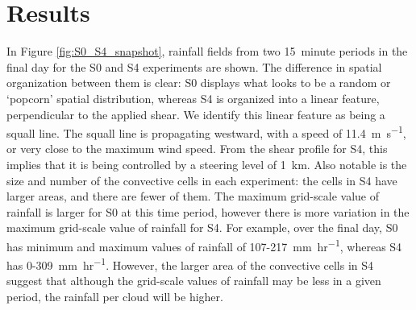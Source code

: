 \documentclass[11pt,a4paper]{article}
\begin{document}
\newpage
\section{Results}

%

%
In Figure \ref{fig:S0_S4_snapshot}, rainfall fields from two \SI{15}{minute} periods in the final day for the S0 and S4 experiments are shown. The difference in spatial organization between them is clear: S0 displays what looks to be a random or `popcorn' spatial distribution, whereas S4 is organized into a linear feature, perpendicular to the applied shear. We identify this linear feature as being a squall line. The squall line is propagating westward, with a speed of \SI{11.4}{m.s^{-1}}, or very close to the maximum wind speed. From the shear profile for S4, this implies that it is being controlled by a steering level of \SI{1}{km}. Also notable is the size and number of the convective cells in each experiment: the cells in S4 have larger areas, and there are fewer of them. The maximum grid-scale value of rainfall is larger for S0 at this time period, however there is more variation in the maximum grid-scale value of rainfall for S4. For example, over the final day, S0 has minimum and maximum values of rainfall of \SI{107}{}-\SI{217}{mm.hr^{-1}}, whereas S4 has \SI{0}{}-\SI{309}{mm.hr^{-1}}. However, the larger area of the convective cells in S4 suggest that although the grid-scale values of rainfall may be less in a given period, the rainfall per cloud will be higher.
\end{document}
